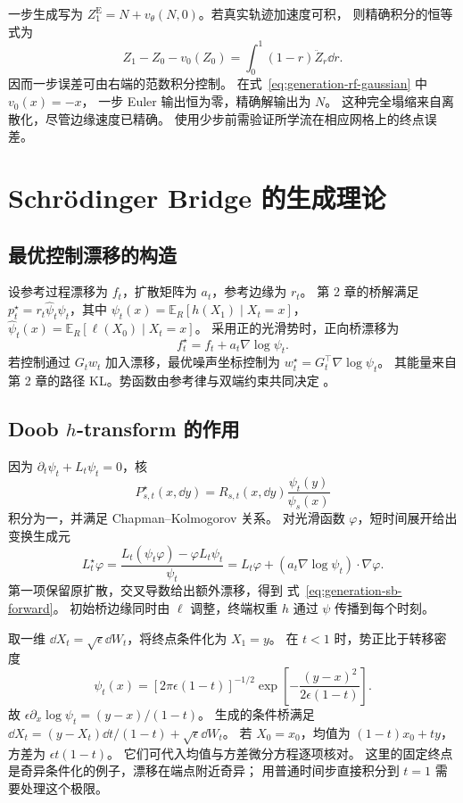 一步生成写为 \(Z_1^{\mathrm E}=N+v_\theta(N,0)\)。若真实轨迹加速度可积，
则精确积分的恒等式为
\[
 Z_1-Z_0-v_0(Z_0)=\int_0^1(1-r)\ddot Z_r\dd r.
\]
因而一步误差可由右端的范数积分控制。
在式~\eqref{eq:generation-rf-gaussian} 中 \(v_0(x)=-x\)，
一步 Euler 输出恒为零，精确解输出为 \(N\)。
这种完全塌缩来自离散化，尽管边缘速度已精确。
使用少步前需验证所学流在相应网格上的终点误差。

\section{Schrödinger Bridge 的生成理论}
\label{sec:generation-sb}

\subsection{最优控制漂移的构造}

设参考过程漂移为 \(f_t\)，扩散矩阵为 \(a_t\)，参考边缘为 \(r_t\)。
第 2 章的桥解满足 \(p_t^\star=r_t\widehat\psi_t\psi_t\)，其中
\(\psi_t(x)=\mathbb E_R[h(X_1)\mid X_t=x]\)，
\(\widehat\psi_t(x)=\mathbb E_R[\ell(X_0)\mid X_t=x]\)。
采用正的光滑势时，正向桥漂移为
\begin{equation}
 f_t^\star=f_t+a_t\nabla\log\psi_t.
 \label{eq:generation-sb-forward}
\end{equation}
若控制通过 \(G_tw_t\) 加入漂移，最优噪声坐标控制为
\(w_t^\star=G_t^\top\nabla\log\psi_t\)。
其能量来自第 2 章的路径 KL。势函数由参考律与双端约束共同决定
\cite{leonard2014schrodinger}。

\subsection{Doob \texorpdfstring{\(h\)}{h}-transform 的作用\requiredderivation}

因为 \(\partial_t\psi_t+L_t\psi_t=0\)，核
\[
 P_{s,t}^\star(x,\dd y)=R_{s,t}(x,\dd y)\frac{\psi_t(y)}{\psi_s(x)}
\]
积分为一，并满足 Chapman--Kolmogorov 关系。
对光滑函数 \(\varphi\)，短时间展开给出变换生成元
\[
 L_t^\star\varphi=\frac{L_t(\psi_t\varphi)-\varphi L_t\psi_t}{\psi_t}
 =L_t\varphi+(a_t\nabla\log\psi_t)\cdot\nabla\varphi.
\]
第一项保留原扩散，交叉导数给出额外漂移，得到
式~\eqref{eq:generation-sb-forward}。
初始桥边缘同时由 \(\ell\) 调整，终端权重 \(h\) 通过 \(\psi\) 传播到每个时刻。

\begin{example}
取一维 \(\dd X_t=\sqrt\epsilon\dd W_t\)，将终点条件化为 \(X_1=y\)。
在 \(t<1\) 时，势正比于转移密度
\[
 \psi_t(x)=[2\pi\epsilon(1-t)]^{-1/2}
       \exp\left[-\frac{(y-x)^2}{2\epsilon(1-t)}\right].
\]
故 \(\epsilon\partial_x\log\psi_t=(y-x)/(1-t)\)。
生成的条件桥满足
\(\dd X_t=(y-X_t)\dd t/(1-t)+\sqrt\epsilon\dd W_t\)。
若 \(X_0=x_0\)，均值为 \((1-t)x_0+ty\)，方差为 \(\epsilon t(1-t)\)。
它们可代入均值与方差微分方程逐项核对。
这里的固定终点是奇异条件化的例子，漂移在端点附近奇异；
用普通时间步直接积分到 \(t=1\) 需要处理这个极限。
\end{example}

